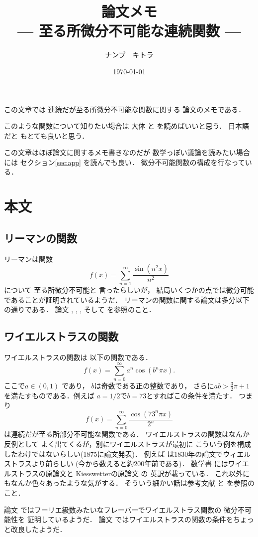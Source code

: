 \documentclass[leqno, a4paper, 12pt]{jsarticle}
\title{論文メモ
\large{\\--- 至る所微分不可能な連続関数 ---}
}
\author{ナンブ　キトラ}
\date{\today}
\begin{document}
\maketitle


この文章では
連続だが至る所微分不可能な関数に関する
論文のメモである．

このような関数について知りたい場合は
大体
\cite{johan2003}
と
\cite{MR3444902}
を読めばいいと思う．
日本語だと
\cite{wa1}
もとても良いと思う．

この文章はほぼ論文に関するメモ書きなのだが
数学っぽい議論を読みたい場合には
セクション\ref{sec:app}
を読んでも良い．
微分不可能関数の構成を行なっている．

\section{本文}


\subsection{リーマンの関数}
リーマンは関数
\[
f(x)=\sum_{n=1}^{\infty}\frac{\sin(n^{2}x)}{n^{2}}
\]
について
至る所微分不可能と
言ったらしいが，
結局いくつかの点では微分可能であることが証明されているようだ．
リーマンの関数に関する論文は多分以下の通りである．
論文
\cite{MR0864753}
\cite{MR0640257}, 
\cite{MR0276422}, 
\cite{MR0308337}, 
そして
\cite{MR0715889}
を参照のこと．

\subsection{ワイエルストラスの関数}
ワイエルストラスの関数は
以下の関数である．
\[
f(x)=\sum_{n=0}^{\infty}a^{n}\cos(b^{n}\pi x). 
\]
ここで$a\in (0, 1)$
であり，
$b$は奇数である正の整数であり，
さらに$ab>\frac{3}{2}\pi +1$
を満たすものである．例えば
$a=1/2$で$b=73$とすればこの条件を満たす．
つまり
\[
f(x)=\sum_{n=0}^{\infty}\frac{\cos(73^{n}\pi x)}{2^{n}}
\]
は連続だが至る所部分不可能な関数である．
ワイエルストラスの関数はなんか反例として
よく出てくるが，別にワイエルストラスが最初に
こういう例を構成したわけではないらしい(1875に論文発表)．
例えば
\cite{MR0202936}
は1830年の論文でウィエルストラスより前らしい
(今から数えると約200年前である)．
数学書\cite{MR2049443}
にはワイエルストラスの原論文と
Kiesswetterの原論文
の
英訳が載っている．
これ以外にもなんか色々あったような気がする．
そういう細かい話は参考文献
\cite{johan2003}
と
\cite{MR3444902}
を参照のこと．

論文
\cite{MR2587578}
ではフーリエ級数みたいなフレーバーでワイエルストラス関数の
微分不可能性を
証明しているようだ．
論文
\cite{MR1501044}
ではワイエルストラスの関数の条件をちょっと改良したようだ．
\end{document}
